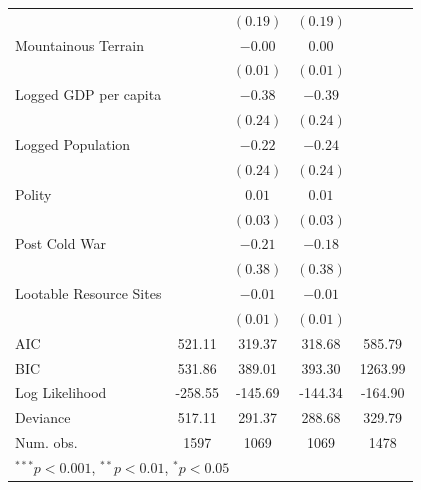 \documentclass[12pt,]{book}
\let\origtable\table
\let\endorigtable\endtable
\renewenvironment{table}[1][2] {
    \singlespacing
    \expandafter\origtable\expandafter[H]
} {
    \endorigtable
}
\theoremstyle{definition}
\theoremstyle{definition}
\theoremstyle{definition}
\theoremstyle{remark}
\begin{document}
\begin{table}
\begin{center}
\begin{tabular}{l c c c c }
                                  &               & $(0.19)$     & $(0.19)$    &              \\
Mountainous Terrain               &               & $-0.00$      & $0.00$      &              \\
                                  &               & $(0.01)$     & $(0.01)$    &              \\
Logged GDP per capita             &               & $-0.38$      & $-0.39$     &              \\
                                  &               & $(0.24)$     & $(0.24)$    &              \\
Logged Population                 &               & $-0.22$      & $-0.24$     &              \\
                                  &               & $(0.24)$     & $(0.24)$    &              \\
Polity                            &               & $0.01$       & $0.01$      &              \\
                                  &               & $(0.03)$     & $(0.03)$    &              \\
Post Cold War                     &               & $-0.21$      & $-0.18$     &              \\
                                  &               & $(0.38)$     & $(0.38)$    &              \\
Lootable Resource Sites           &               & $-0.01$      & $-0.01$     &              \\
                                  &               & $(0.01)$     & $(0.01)$    &              \\
\hline
AIC                               & 521.11        & 319.37       & 318.68      & 585.79       \\
BIC                               & 531.86        & 389.01       & 393.30      & 1263.99      \\
Log Likelihood                    & -258.55       & -145.69      & -144.34     & -164.90      \\
Deviance                          & 517.11        & 291.37       & 288.68      & 329.79       \\
Num. obs.                         & 1597          & 1069         & 1069        & 1478         \\
\hline
\multicolumn{5}{l}{\scriptsize{$^{***}p<0.001$, $^{**}p<0.01$, $^*p<0.05$}}
\end{tabular}
\caption{Logit Models of Rebel Group Formation}
\label{tab:entry}
\end{center}
\end{table}
\end{document}
